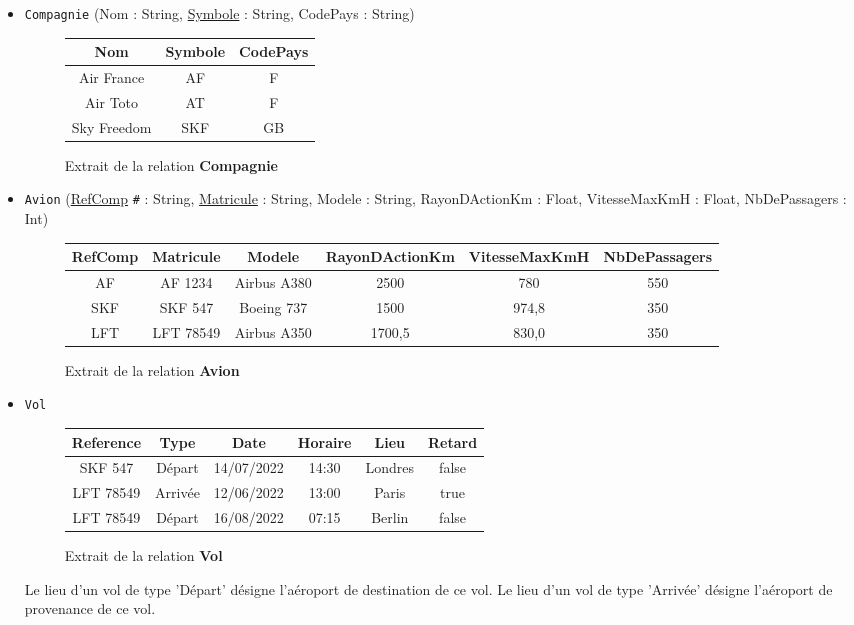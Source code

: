 \documentclass[11pt,a4paper,french,twoside]{PMCours}
\begin{document}
\begin{itemize}
\item \verb'Compagnie' (Nom : String, \underline{Symbole} : String, CodePays : String)
\begin{figure}[ht]
\begin{center}
\begin{tabular}{|c|c|c|}\hline
Nom & Symbole & CodePays\\\hline
Air France & AF & F\\\hline
Air Toto & AT & F\\\hline
Sky Freedom & SKF & GB\\\hline
\end{tabular}
\end{center}
\caption{Extrait de la relation \textbf{Compagnie}}
\end{figure}
\end{itemize}

\begin{itemize}
\item \verb'Avion' (\underline{RefComp} \verb'#' : String, \underline{Matricule} : String, Modele : String, RayonDActionKm : Float, VitesseMaxKmH : Float, NbDePassagers : Int)
\begin{figure}[ht]
\begin{center}
\begin{tabular}{|c|c|c|c|c|c|}\hline
RefComp & Matricule & Modele & RayonDActionKm & VitesseMaxKmH & NbDePassagers\\\hline
AF & AF 1234 & Airbus A380 & 2500 & 780 & 550\\\hline
SKF & SKF 547 & Boeing 737 & 1500 & 974,8 & 350\\\hline
LFT & LFT 78549 & Airbus A350 & 1700,5 & 830,0 & 350\\\hline
\end{tabular}
\end{center}
\caption{Extrait de la relation \textbf{Avion}}
\end{figure}
\end{itemize}

\begin{itemize}
\item \verb'Vol' 
\begin{figure}[ht]
\begin{center}
\begin{tabular}{|c|c|c|c|c|c|}\hline
Reference & Type & Date & Horaire & Lieu & Retard\\\hline
SKF 547 & Départ & 14/07/2022 & 14:30 & Londres & false\\\hline
LFT 78549 & Arrivée & 12/06/2022 & 13:00 & Paris & true\\\hline
LFT 78549 & Départ & 16/08/2022 & 07:15 & Berlin & false\\\hline
\end{tabular}
\end{center}
\caption{Extrait de la relation \textbf{Vol}}
\end{figure}
Le lieu d'un vol de type 'Départ' désigne l'aéroport de destination de ce vol. Le lieu d'un vol de type 'Arrivée' désigne l'aéroport de provenance de ce vol. 
\end{itemize}
\end{document}
